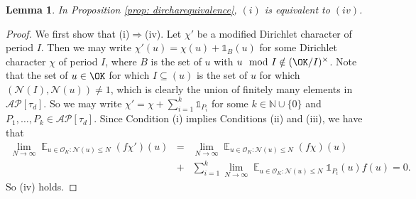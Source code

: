 \documentclass[11pt]{amsart}
\newtheorem{lemma}{Lemma}[section]
\theoremstyle{definition}
\DeclareMathOperator*{\E}{\mathbb{E}}
\newcommand{\C}{{\mathbb C}}
\newcommand{\N}{{\mathbb N}}
\newcommand{\NN}{{\mathcal N}}
\begin{document}
\begin{lemma}\label{dircharequivalence}
In Proposition \ref{prop: dircharequivalence}, $(i)$ is equivalent to $(iv)$.
\end{lemma}

\begin{proof}
We first show that (i)$\Rightarrow$(iv).
Let $\chi'$ be a modified Dirichlet character of period $I$. Then we may write $\chi'(u)=\chi(u)+\mathds{1}_{B}(u)$ for some  Dirichlet character $\chi$ of period $I$, where $B$ is the set of $u$ with $u \mod I\notin (\OK/I)^{\times}$. Note that the set of $u\in\OK$ for which $I\subseteq (u)$ is the set of $u$ for which $(\NN(I),\NN(u))\neq 1$, which is clearly the union of finitely many elements in $\mathcal{AP}[\tau_{d}]$.
So we may write $\chi'=\chi+\sum_{i=1}^{k}\mathds{1}_{P_{i}}$ for some $k\in\N\cup\{0\}$ and $P_{1},\dots,P_{k}\in \mathcal{AP}[\tau_{d}]$. Since Condition (i) implies Conditions (ii) and (iii), we have that 
\begin{eqnarray*}
\lim_{N\to\infty}\E_{u\in\mathcal{O}_{K}\colon \NN(u)\leq N}(f\chi')(u) & = & \lim_{N\to\infty}\E_{u\in\mathcal{O}_{K}\colon \NN(u)\leq N}(f\chi)(u)\\
& + & \sum_{i=1}^{k}\lim_{N\to\infty}\E_{u\in\mathcal{O}_{K}\colon \NN(u)\leq N}\mathds{1}_{P_{i}}(u)f(u)=0.
\end{eqnarray*}
So (iv) holds.


\end{proof}
\end{document}
